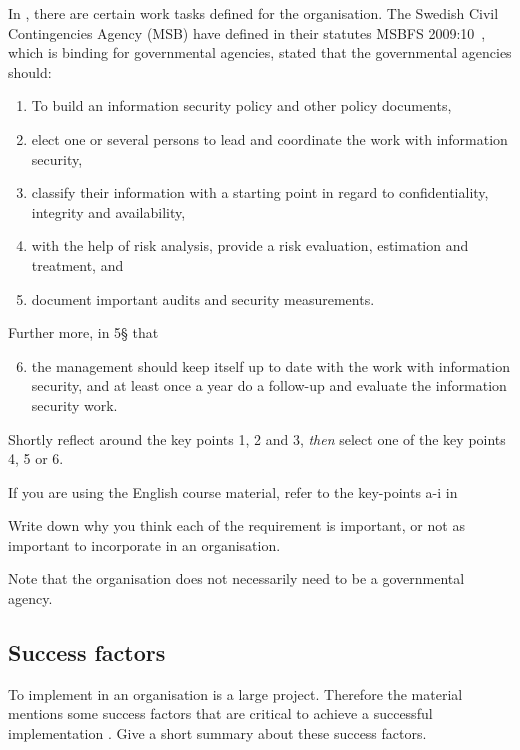\documentclass[a4paper]{article}
\begin{document}
In , there are certain work tasks defined for the organisation.
The Swedish Civil Contingencies Agency (MSB) have defined in their statutes
MSBFS 2009:10~\cite{MSBFS2009:10}, which is binding for governmental agencies, 
stated that the governmental agencies should:
\begin{enumerate}
  \item To build an information security policy and other policy documents,
  \item elect one or several persons to lead and coordinate the work with
    information security,
  \item classify their information with a starting point in regard to
    confidentiality, integrity and availability,
  \item with the help of risk analysis, provide a risk evaluation, estimation
    and treatment, and
  \item document important audits and security measurements.
\end{enumerate}
Further more, in 5§ that

\begin{enumerate}\setcounter{enumi}{5}
  \item the management should keep itself up to date with the work with
    information security, and at least once a year do a follow-up and evaluate
    the information security work.
\end{enumerate}

Shortly reflect around the key points 1, 2 and 3, \emph{then} select one of the key
points 4, 5 or 6.

If you are using the English course material, refer to the key-points a-i in
\cite[chap. 3.2.1]{iso27000}

Write down why you think each of the requirement is important, or not as
important to incorporate in an organisation.

Note that the organisation does not necessarily need to be a governmental
agency.

\subsection{Success factors}

To implement  in an organisation is a large project. Therefore
the material mentions some success factors that are critical to achieve a
successful implementation \cite[3.6]{iso27000}. Give a short summary about
these success factors.
\end{document}
